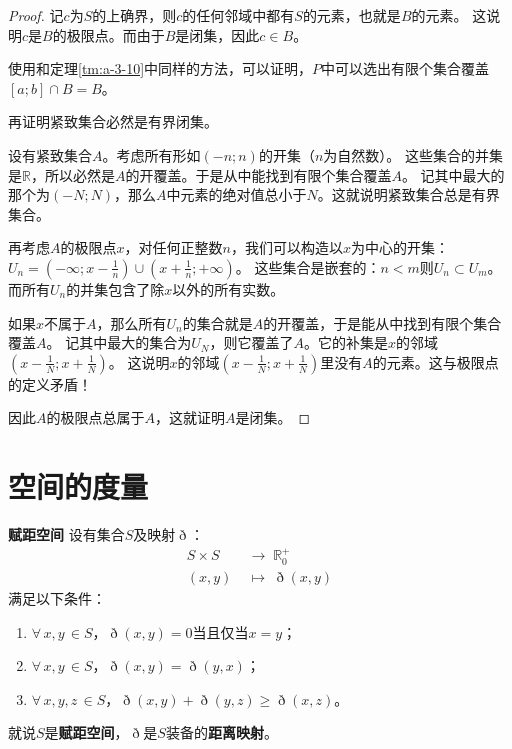\documentclass[12pt,UTF8]{ctexbook}
\begin{document}
\begin{appendix}
\begin{proof}
    记$c$为$S$的上确界，则$c$的任何邻域中都有$S$的元素，也就是$B$的元素。
    这说明$c$是$B$的极限点。而由于$B$是闭集，因此$c\in B$。

    使用和定理\ref{tm:a-3-10}中同样的方法，可以证明，$P$中可以选出有限个集合覆盖$[a;b]\cap B = B$。

    再证明紧致集合必然是有界闭集。

    设有紧致集合$A$。考虑所有形如$(-n;n)$的开集（$n$为自然数）。
    这些集合的并集是$\mathbb{R}$，所以必然是$A$的开覆盖。于是从中能找到有限个集合覆盖$A$。
    记其中最大的那个为$(-N;N)$，那么$A$中元素的绝对值总小于$N$。这就说明紧致集合总是有界集合。

    再考虑$A$的极限点$x$，对任何正整数$n$，我们可以构造以$x$为中心的开集：$\displaystyle U_n = \left(-\infty;x-\frac{1}{n}\right)\cup\left(x+\frac{1}{n};+\infty\right)$。
    这些集合是嵌套的：$n<m$则$U_n\subset U_m$。而所有$U_n$的并集包含了除$x$以外的所有实数。

    如果$x$不属于$A$，那么所有$U_n$的集合就是$A$的开覆盖，于是能从中找到有限个集合覆盖$A$。
    记其中最大的集合为$U_N$，则它覆盖了$A$。它的补集是$x$的邻域$\displaystyle\left(x-\frac{1}{N};x+\frac{1}{N}\right)$。
    这说明$x$的邻域$\displaystyle\left(x-\frac{1}{N};x+\frac{1}{N}\right)$里没有$A$的元素。这与极限点的定义矛盾！
    
    因此$A$的极限点总属于$A$，这就证明$A$是闭集。

\end{proof}

\chapter{空间的度量}

\begin{df}{\textbf{赋距空间}}
    设有集合$S$及映射$\eth$：
    \begin{align*}
        S\times S \;&\rightarrow \; \mathbb{R}_0^+ \\
        (x, y) \;&\mapsto \; \eth(x, y)
    \end{align*}
    满足以下条件：
    \begin{enumerate}
        \item $\forall \, x, y\, \in S$，$\eth(x, y) = 0$当且仅当$x = y$；
        \item $\forall \, x, y\, \in S$，$\eth(x, y) = \eth(y, x)$；
        \item $\forall \, x, y, z\, \in S$，$\eth(x, y) + \eth(y, z) \geqslant \eth (x, z)$。
    \end{enumerate}
    就说$S$是\textbf{赋距空间}，$\eth$是$S$装备的\textbf{距离映射}。
\end{df}


\end{appendix}
\end{document}
